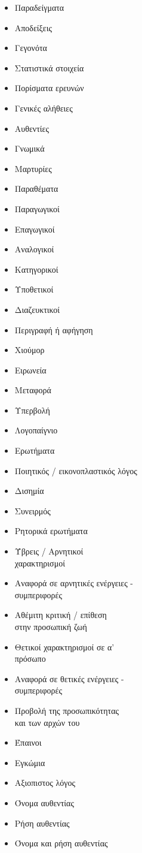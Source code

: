 \documentclass[11pt]{article}
\begin{document}
\begin{itemize}[label=\faEdit,itemsep=-1mm]
\item Παραδείγματα
\item Αποδείξεις
\item Γεγονότα
\item Στατιστικά στοιχεία
\item Πορίσματα ερευνών
\item Γενικές αλήθειες
\item Αυθεντίες
\item Γνωμικά
\item Μαρτυρίες
\item Παραθέματα
\item Παραγωγικοί
\item Επαγωγικοί
\item Αναλογικοί
\item Κατηγορικοί
\item Υποθετικοί
\item Διαζευκτικοί
\item Περιγραφή ή αφήγηση
\item Χιούμορ
\item Ειρωνεία
\item Μεταφορά
\item Υπερβολή
\item Λογοπαίγνιο
\item Ερωτήματα
\item Ποιητικός / εικονοπλαστικός λόγος
\item Δισημία
\item Συνειρμός
\item Ρητορικά ερωτήματα
\item Ύβρεις / Αρνητικοί \\χαρακτηρισμοί
\item Αναφορά σε αρνητικές ενέργειες -\\ συμπεριφορές
\item Αθέμιτη κριτική / επίθεση \\στην προσωπική ζωή
\item Θετικοί χαρακτηρισμοί σε α'\\ πρόσωπο
\item Αναφορά σε θετικές ενέργειες - \\συμπεριφορές
\item Προβολή της προσωπικότητας \\και των αρχών του
\item Έπαινοι
\item Εγκώμια
\item Αξιοπιστος λόγος
\item Όνομα αυθεντίας
\item Ρήση αυθεντίας
\item Όνομα και ρήση αυθεντίας
\end{itemize}
\end{document}
